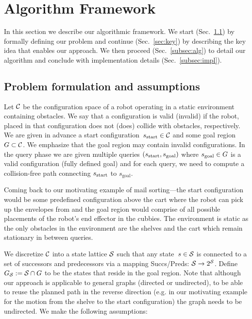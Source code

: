 \documentclass[a4paper]{report}
\begin{document}
\section{Algorithm Framework}
\label{sec:alg}
In this section we describe our algorithmic framework. We start (Sec.~\ref{sec:pdef}) by formally defining our problem and continue (Sec.~\ref{sec:key}) by describing the key idea that enables our approach.
We then proceed (Sec.~\ref{subsec:alg}) to detail our algorithm and conclude with implementation details (Sec.~\ref{subsec:impl}).

\subsection{Problem formulation and assumptions}
\label{sec:pdef}
Let $\mathcal{C}$ be the configuration space of a robot operating in a static environment containing obstacles.
We say that a configuration is valid (invalid) if the robot, placed in that configuration does not (does) collide with obstacles, respectively.
We are given in advance a start configuration~$s_{\textrm{start}} \in \mathcal{C}$ and some goal region~$G \subset \mathcal{C}$.
We emphasize that the goal region may contain invalid configurations.
In the query phase we are given multiple queries $(s_{\textrm{start}}, s_{\text{goal}})$ where $s_{\rm goal} \in G$ is a valid configuration (fully defined goal) and for each query, we need to compute a collision-free path connecting $s_{\textrm{start}}$ to $s_{\text{goal}}$.

Coming back to our motivating example of mail sorting---the start configuration would be some predefined configuration above the cart where the robot can pick up the envelopes from and the goal region would comprise of all possible placements of the robot's end effector in the cubbies. The environment is static as the only obstacles in the environment are the shelves and the cart which remain stationary in between queries.

We discretize $\mathcal{C}$ into a state lattice $\mathcal{S}$ such that any state~$s \in \mathcal{S}$ is connected to a set of successors and predecessors via a mapping Succs/Preds: $\mathcal{S} \rightarrow 2^\mathcal{S}$.
Define $G_\mathcal{S} := \mathcal{S} \cap G$ to be the states that reside in the goal region. Note that although our approach is applicable to general graphs (directed or undirected), to be able to reuse the planned path in the reverse direction (e.g. in our motivating example for the motion from the shelve to the start configuration) the graph needs to be undirected.
We make the following assumptions:
\end{document}
